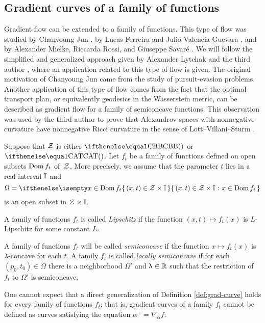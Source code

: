 \subsection*{Gradient curves of a family of functions}

Gradient flow can be extended to a family of functions.
This type of flow was studied by Chanyoung Jun \cite{jun-thesis,jun:grad}, by Lucas Ferreira and Julio Valencia-Guevara \cite{ferreira-valencia}, and by Alexander Mielke, Riccarda Rossi, and Giuseppe Savar\'{e} \cite{mielke-rossi-savare}.
We will follow the simplified and generalized approach given by Alexander Lytchak and the third author \cite{lytchak-petrunin-2020}, where an application related to this type of flow is given.
The original motivation of Chanyoung Jun came from the study of pursuit-evasion problems.
Another application of this type of flow comes from the fact that
 the optimal transport plan, or equivalently geodesics in the Wasserstein metric, can be described as gradient flow for a family of semiconcave functions.
This observation was used by the third author to prove that Alexandrov spaces with nonnegative curvature have nonnegative Ricci curvature in the sense of Lott--Villani--Sturm \cite{petrunin:optimal}.

Suppose that $\mathcal{Z}$ is either $\Alex{}$ or $\CAT{}$.
Let $f_t$ be a family of functions defined on open subsets $\mathop{\rm Dom}\nolimits f_t$ of~$\mathcal{Z}$.
More precisely, we assume that the parameter $t$ lies in a real interval $\mathbb{I}$ and 
\[\Omega=\set{(x,t)\in\spc{Z}\times \II}{x\in\Dom f_t}\]
is an open subset in $\spc{Z}\times \II$.

A family of functions $f_t$ is called \emph{Lipschitz} if 
the function $(x,t)\mapsto f_t(x)$ is 
$L$-Lipschitz for some constant $L$.

A family of functions $f_t$ will be called \emph{semiconcave} if 
the function $x\mapsto f_t(x)$ is $\lambda$-concave for each $t$.
A family $f_t$ is called \emph{locally semiconcave} if for each $(p_0,t_0)\in \Omega$ there is a neighborhood $\Omega'$ and $\lambda\in\RR$ such that the restriction of $f_t$ to $\Omega'$ is semiconcave. 

One cannot expect that a direct generalization of Definition \ref{def:grad-curve}  holds for every family of functions $f_t$; that is, gradient curves of a family $f_t$ cannot be defined as curves satisfying the equation $\alpha^+=\nabla_{\alpha} f$.

